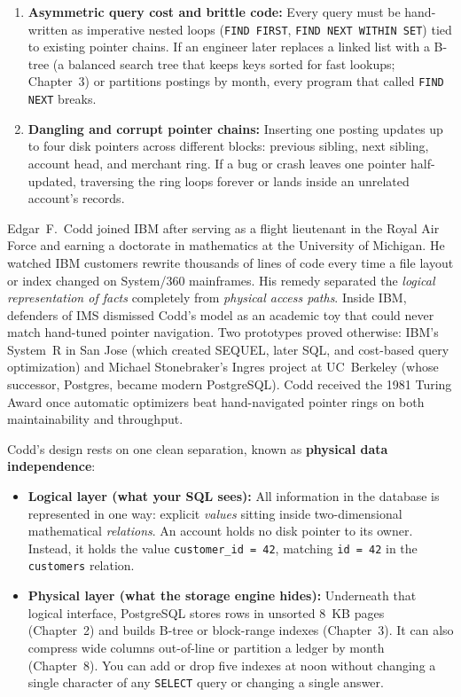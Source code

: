 \begin{enumerate}
  \item \textbf{Asymmetric query cost and brittle code:} Every query must be hand-written as imperative nested loops (\texttt{FIND FIRST}, \texttt{FIND NEXT WITHIN SET}) tied to existing pointer chains. If an engineer later replaces a linked list with a B-tree (a balanced search tree that keeps keys sorted for fast lookups; Chapter~3) or partitions postings by month, every program that called \texttt{FIND NEXT} breaks.
  \item \textbf{Dangling and corrupt pointer chains:} Inserting one posting updates up to four disk pointers across different blocks: previous sibling, next sibling, account head, and merchant ring. If a bug or crash leaves one pointer half-updated, traversing the ring loops forever or lands inside an unrelated account's records.
\end{enumerate}

\begin{historybox}
Edgar~F.\ Codd joined IBM after serving as a flight lieutenant in the Royal Air Force and earning a doctorate in mathematics at the University of Michigan. He watched IBM customers rewrite thousands of lines of code every time a file layout or index changed on System/360 mainframes. His remedy separated the \emph{logical representation of facts} completely from \emph{physical access paths}. Inside IBM, defenders of IMS dismissed Codd's model as an academic toy that could never match hand-tuned pointer navigation. Two prototypes proved otherwise: IBM's System~R in San Jose (which created SEQUEL, later SQL, and cost-based query optimization) and Michael Stonebraker's Ingres project at UC~Berkeley (whose successor, Postgres, became modern PostgreSQL). Codd received the 1981 Turing Award once automatic optimizers beat hand-navigated pointer rings on both maintainability and throughput.
\end{historybox}

Codd's design rests on one clean separation, known as \textbf{physical data independence}:

\begin{itemize}
  \item \textbf{Logical layer (what your SQL sees):} All information in the database is represented in one way: explicit \emph{values} sitting inside two-dimensional mathematical \emph{relations}. An account holds no disk pointer to its owner. Instead, it holds the value \texttt{customer\_id = 42}, matching \texttt{id = 42} in the \texttt{customers} relation.
  \item \textbf{Physical layer (what the storage engine hides):} Underneath that logical interface, PostgreSQL stores rows in unsorted 8~KB pages (Chapter~2) and builds B-tree or block-range indexes (Chapter~3). It can also compress wide columns out-of-line or partition a ledger by month (Chapter~8). You can add or drop five indexes at noon without changing a single character of any \texttt{SELECT} query or changing a single answer.
\end{itemize}

